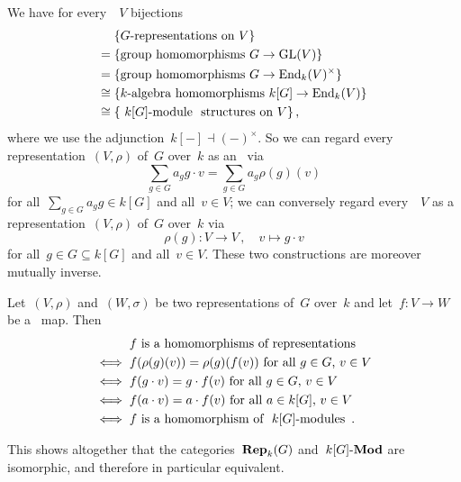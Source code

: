 \section{}

We have for every~{\kvs}~$V$ bijections
\begin{align*}
       {}&  \{ \text{$G$-representations on~$V$} \} \\
      ={}&  \{ \text{group homomorphisms~$G \to \GL(V)$} \} \\
      ={}&  \{ \text{group homomorphisms~$G \to \End_k(V)^\times$} \} \\
  \cong{}&  \{ \text{{\kalg} homomorphisms~$k[G] \to \End_k(V)$} \} \\
  \cong{}&  \{ \text{{\module{$k[G]$}} structures on~$V$} \} \,,
\end{align*}
where we use the adjunction~$k[-] \dashv (-)^\times$.
So we can regard every representation~$(V,\rho)$ of~$G$ over~$k$ as an~{} via
\[
    \sum_{g \in G} a_g g
    \cdot
    v
  = \sum_{g \in G} a_g \rho(g)(v)
\]
for all~$\sum_{g \in G} a_g g \in k[G]$ and all~$v \in V$;
we can conversely regard every~{}~$V$ as a representation~$(V,\rho)$ of~$G$ over~$k$ via
\[
          \rho(g)
  \colon  V
  \to     V \,,
  \quad   v
  \mapsto g \cdot v
\]
for all~$g \in G \subseteq k[G]$ and all~$v \in V$.
These two constructions are moreover mutually inverse.

Let~$(V,\rho)$ and~$(W,\sigma)$ be two representations of~$G$ over~$k$ and let~$f \colon V \to W$ be a~{\klin} map.
Then
\begin{align*}
      {}& \text{$f$ is a homomorphisms of representations}  \\
  \iff{}& \text{$f(\rho(g)(v)) = \rho(g)(f(v))$ for all~$g \in G$,~$v \in V$} \\
  \iff{}& \text{$f(g \cdot v) = g \cdot f(v)$ for all~$g \in G$,~$v \in V$} \\
  \iff{}& \text{$f(a \cdot v) = a \cdot f(v)$ for all~$a \in k[G]$,~$v \in V$}  \\
  \iff{}& \text{$f$ is a homomorphism of~{\modules{$k[G]$}}} \,.
\end{align*}

This shows altogether that the categories~$\mathbf{Rep}_{k}(G)$ and~$\text{$k[G]$-$\mathbf{Mod}$}$ are isomorphic, and therefore in particular equivalent.




